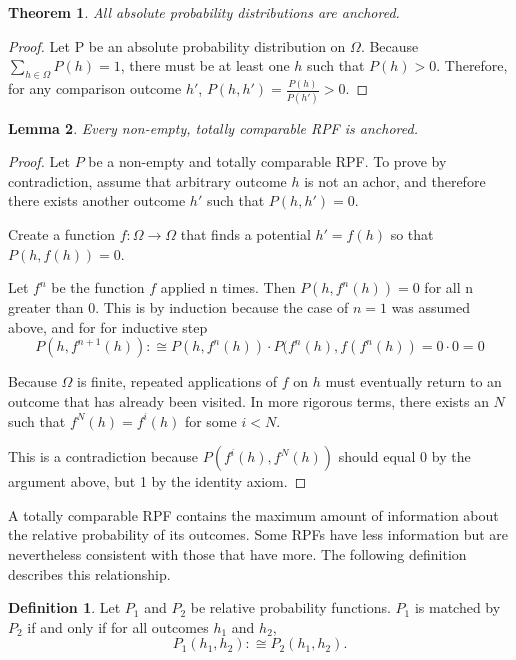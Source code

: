 \documentclass[twoside]{article}
\theoremstyle{plain}%
\newtheorem{theorem}{Theorem}[section]
\newtheorem{lemma}[theorem]{Lemma}
\theoremstyle{definition}
\newtheorem{definition}{Definition}[section]
\theoremstyle{remark}
\begin{document}
\begin{theorem}
\label{thm:absolute_anchored}
All absolute probability distributions are anchored.
\end{theorem}

\begin{proof}
Let P be an absolute probability distribution on \(\Omega\). Because \(\sum_{h \in \Omega} P(h) = 1\), there must be at least one \(h\) such that \(P(h) > 0\).  Therefore, for any comparison outcome \(h'\), \(P(h, h') = \frac{P(h)}{P(h')} > 0\).
\end{proof}

\begin{lemma}
\label{lemma:totally_comp_anchored}
Every non-empty, totally comparable RPF is anchored.
\end{lemma}

\begin{proof}
Let \(P\) be a non-empty and totally comparable RPF. To prove by contradiction, assume that arbitrary outcome \(h\) is not an achor, and therefore there exists another outcome \(h'\) such that \(P(h, h') = 0\).

Create a function \(f: \Omega \rightarrow \Omega\) that finds a potential \(h' = f(h)\) so that \(P(h, f(h)) = 0\).

Let \(f^n\) be the function \(f\) applied n times. Then \(P(h, f^n(h)) = 0\) for all n greater than 0. This is by induction because the case of \(n = 1\) was assumed above, and for for inductive step
\[P(h, f^{n+1}(h)) :\cong P(h, f^n(h)) \cdot P(f^n(h), f(f^n(h)) = 0 \cdot 0 = 0\]

Because \(\Omega\) is finite, repeated applications of \(f\) on \(h\) must eventually return to an outcome that has already been visited. In more rigorous terms, there exists an \(N\) such that \(f^N(h) = f^i(h)\) for some \(i < N\).

This is a contradiction because \(P(f^i(h), f^N(h))\) should equal 0 by the argument above, but 1 by the identity axiom.
\end{proof}

A totally comparable RPF contains the maximum amount of information about the relative probability of its outcomes. Some RPFs have less information but are nevertheless consistent with those that have more. The following definition describes this relationship.

\begin{definition}
Let \(P_1\) and \(P_2\) be relative probability functions. \(P_1\) is matched by \(P_2\) if and only if for all outcomes \(h_1\) and \(h_2\),
\[P_1(h_1, h_2) :\cong P_2(h_1, h_2).\]
\end{definition}
\end{document}
